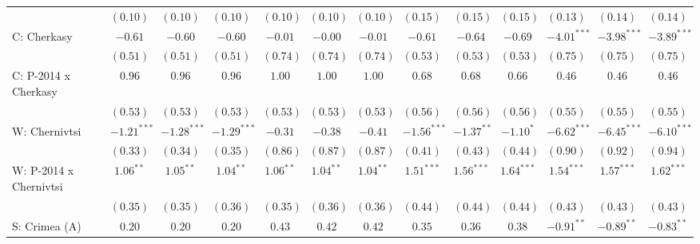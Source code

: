 \begin{table}
\begin{center}
\begin{tiny}
\begin{tabular}{l c c c c c c c c c c c c}
                            & $(0.10)$      & $(0.10)$      & $(0.10)$      & $(0.10)$     & $(0.10)$     & $(0.10)$     & $(0.15)$      & $(0.15)$     & $(0.15)$       & $(0.13)$      & $(0.14)$      & $(0.14)$      \\
C: Cherkasy                 & $-0.61$       & $-0.60$       & $-0.60$       & $-0.01$      & $-0.00$      & $-0.01$      & $-0.61$       & $-0.64$      & $-0.69$        & $-4.01^{***}$ & $-3.98^{***}$ & $-3.89^{***}$ \\
                            & $(0.51)$      & $(0.51)$      & $(0.51)$      & $(0.74)$     & $(0.74)$     & $(0.74)$     & $(0.53)$      & $(0.53)$     & $(0.53)$       & $(0.75)$      & $(0.75)$      & $(0.75)$      \\
C: P-2014 x Cherkasy        & $0.96$        & $0.96$        & $0.96$        & $1.00$       & $1.00$       & $1.00$       & $0.68$        & $0.68$       & $0.66$         & $0.46$        & $0.46$        & $0.46$        \\
                            & $(0.53)$      & $(0.53)$      & $(0.53)$      & $(0.53)$     & $(0.53)$     & $(0.53)$     & $(0.56)$      & $(0.56)$     & $(0.56)$       & $(0.55)$      & $(0.55)$      & $(0.55)$      \\
W: Chernivtsi               & $-1.21^{***}$ & $-1.28^{***}$ & $-1.29^{***}$ & $-0.31$      & $-0.38$      & $-0.41$      & $-1.56^{***}$ & $-1.37^{**}$ & $-1.10^{*}$    & $-6.62^{***}$ & $-6.45^{***}$ & $-6.10^{***}$ \\
                            & $(0.33)$      & $(0.34)$      & $(0.35)$      & $(0.86)$     & $(0.87)$     & $(0.87)$     & $(0.41)$      & $(0.43)$     & $(0.44)$       & $(0.90)$      & $(0.92)$      & $(0.94)$      \\
W: P-2014 x Chernivtsi      & $1.06^{**}$   & $1.05^{**}$   & $1.04^{**}$   & $1.06^{**}$  & $1.04^{**}$  & $1.04^{**}$  & $1.51^{***}$  & $1.56^{***}$ & $1.64^{***}$   & $1.54^{***}$  & $1.57^{***}$  & $1.62^{***}$  \\
                            & $(0.35)$      & $(0.35)$      & $(0.36)$      & $(0.35)$     & $(0.36)$     & $(0.36)$     & $(0.44)$      & $(0.44)$     & $(0.44)$       & $(0.43)$      & $(0.43)$      & $(0.43)$      \\
S: Crimea (A)               & $0.20$        & $0.20$        & $0.20$        & $0.43$       & $0.42$       & $0.42$       & $0.35$        & $0.36$       & $0.38$         & $-0.91^{**}$  & $-0.89^{**}$  & $-0.83^{**}$  \\

\end{tabular}
\end{tiny}
\end{center}
\end{table}
